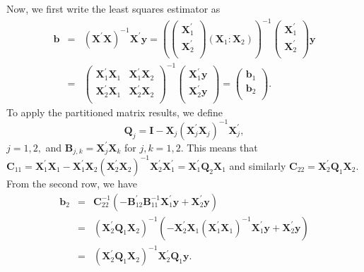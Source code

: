 Now, we first write the least squares estimator as
\begin{eqnarray*}
\mathbf{b} &=& \left( \mathbf{X}^{\prime}\mathbf{X}\right)^{-1}
\mathbf{X}^{\prime} \mathbf{y} = \left( \left(
  \begin{array}{c}
    \mathbf{X}_1^{\prime} \\
    \mathbf{X}_2^{\prime} \\
  \end{array}
\right)
 \left( \mathbf{X}_1 : \mathbf{X}_2 \right)\right)^{-1}
\left(
  \begin{array}{c}
    \mathbf{X}_1^{\prime} \\
    \mathbf{X}_2^{\prime} \\
  \end{array}
\right) \mathbf{y} \\
&=& \left(
  \begin{array}{cc}
    \mathbf{X}_1^{\prime} \mathbf{X}_1 &\mathbf{X}_1^{\prime} \mathbf{X}_2  \\
   \mathbf{X}_2^{\prime} \mathbf{X}_1  & \mathbf{X}_2^{\prime} \mathbf{X}_2  \\
  \end{array}
 \right)^{-1}
\left(
  \begin{array}{c}
    \mathbf{X}_1^{\prime}  \mathbf{y}\\
    \mathbf{X}_2^{\prime}  \mathbf{y}\\
  \end{array}
\right) = \left(
  \begin{array}{c}
    \mathbf{b}_1\\
    \mathbf{b}_2\\
  \end{array}
\right) .
\end{eqnarray*}
To apply the partitioned matrix results, we define
\begin{equation*}
\mathbf{Q}_j = \mathbf{I} - \mathbf{X}_j
\left(\mathbf{X}_j^{\prime}\mathbf{X}_j \right)^{-1}
\mathbf{X}_j^{\prime} ,
\end{equation*}
$j=1,2,$ and $\mathbf{B}_{j,k} =  \mathbf{X}_j^{\prime}\mathbf{X}_k$ for
$j,k=1,2.$ This means that $\mathbf{C}_{11}=\mathbf{X}_1^{\prime}\mathbf{X}_1 -
\mathbf{X}_1^{\prime}\mathbf{X}_2
(\mathbf{X}_2^{\prime}\mathbf{X}_2)^{-1}
\mathbf{X}_2^{\prime}\mathbf{X}_1^{\prime } = \mathbf{X}_1^{\prime}
\mathbf{Q}_2 \mathbf{X}_1 $ and similarly $\mathbf{C}_{22} =
\mathbf{X}_2^{\prime} \mathbf{Q}_1 \mathbf{X}_2 $. From the second row,
we have
\begin{eqnarray*}
\mathbf{b}_2 &=& \mathbf{C}_{22}^{-1} \left(
-\mathbf{B}_{12}^{\prime} \mathbf{B}_{11}^{-1}\mathbf{X}_1^{\prime}
\mathbf{y} +
\mathbf{X}_2^{\prime}  \mathbf{y} \right)\\
&=& \left(\mathbf{X}_2^{\prime} \mathbf{Q}_1 \mathbf{X}_2
\right)^{-1} \left( - \mathbf{X}_2^{\prime} \mathbf{X}_1
(\mathbf{X}_1^{\prime}\mathbf{X}_1)^{-1} \mathbf{X}_1^{\prime}
\mathbf{y} + \mathbf{X}_2^{\prime}\mathbf{y}  \right) \\
&=& \left(\mathbf{X}_2^{\prime} \mathbf{Q}_1 \mathbf{X}_2
\right)^{-1} \mathbf{X}_2^{\prime} \mathbf{Q}_1\mathbf{y} .
\end{eqnarray*}
